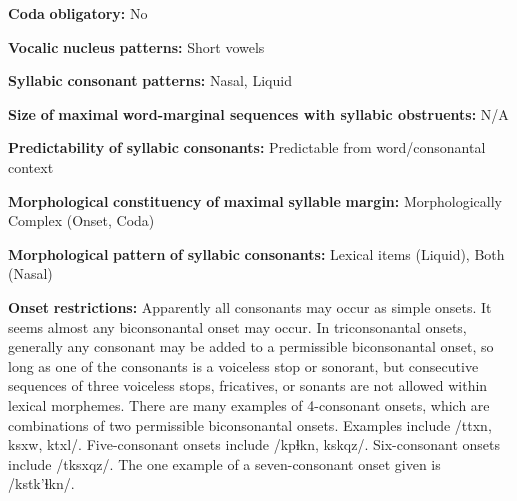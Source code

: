 \documentclass[output=paper]{langsci/langscibook}
\begin{document}
\begin{styleBody}
\textbf{Coda} \textbf{obligatory:} No
\end{styleBody}

\begin{styleBody}
\textbf{Vocalic} \textbf{nucleus} \textbf{patterns:} Short vowels
\end{styleBody}

\begin{styleBody}
\textbf{Syllabic} \textbf{consonant} \textbf{patterns:} Nasal, Liquid
\end{styleBody}

\begin{styleBody}
\textbf{Size} \textbf{of} \textbf{maximal} \textbf{word{}-marginal sequences with syllabic obstruents:} N/A
\end{styleBody}

\begin{styleBody}
\textbf{Predictability} \textbf{of} \textbf{syllabic} \textbf{consonants:} Predictable from word/consonantal context
\end{styleBody}

\begin{styleBody}
\textbf{Morphological} \textbf{constituency} \textbf{of} \textbf{maximal} \textbf{syllable} \textbf{margin:} Morphologically Complex (Onset, Coda)
\end{styleBody}

\begin{styleBody}
\textbf{Morphological} \textbf{pattern} \textbf{of} \textbf{syllabic} \textbf{consonants:} Lexical items (Liquid), Both (Nasal)
\end{styleBody}

\begin{styleBody}
\textbf{Onset} \textbf{restrictions:} Apparently all consonants may occur as simple onsets. It seems almost any biconsonantal onset may occur. In triconsonantal onsets, generally any consonant may be added to a permissible biconsonantal onset, so long as one of the consonants is a voiceless stop or sonorant, but consecutive sequences of three voiceless stops, fricatives, or sonants are not allowed within lexical morphemes. There are many examples of 4-consonant onsets, which are combinations of two permissible biconsonantal onsets. Examples include /ttxn, ksxw, ktxl/. Five-consonant onsets include /kpɬkn, kskqz/. Six-consonant onsets include /tksxqz/. The one example of a seven-consonant onset given is /kstk’ɬkn/.
\end{styleBody}
\end{document}
